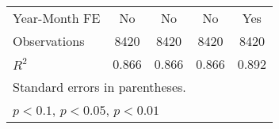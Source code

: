 \documentclass[12pt]{article}
\begin{document}
\begin{table}[htbp]
\begin{tabular}{l*{4}{c}}
Year-Month FE        &    No &    No&    No&    Yes\\  
Observations                   &    8420         &    8420         &    8420         &    8420         \\
$R^2$                   &       0.866         &       0.866         &       0.866         &       0.892         \\
\bottomrule
\multicolumn{5}{l}{\footnotesize Standard errors in parentheses.}\\
\multicolumn{5}{l}{\footnotesize \sym{*} \(p<0.1\), \sym{**} \(p<0.05\), \sym{***} \(p<0.01\)}\\
\end{tabular}
\end{table}
\end{document}
